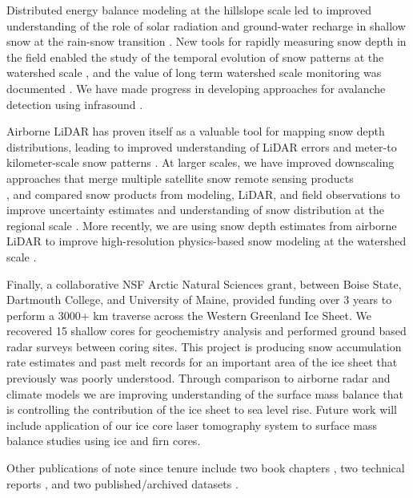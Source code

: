 \documentclass[11pt]{article}
\begin{document}
Distributed energy balance modeling at the hillslope scale led to improved understanding of the role of solar radiation and ground-water recharge in shallow snow at the rain-snow transition \citep{Kormos:2014b,Kormos:2014,Kormos:2015}.  New tools for rapidly measuring snow depth in the field enabled the study of the temporal evolution of snow patterns at the watershed scale \citep{Anderson:2014}, and the value of long term watershed scale monitoring was documented \citep{McNamara:2017}.  We have made progress in developing approaches for avalanche detection using infrasound \citep{Havens:2014}.

Airborne LiDAR has proven itself as a valuable tool for mapping snow depth distributions, leading to improved understanding of LiDAR errors and meter-to kilometer-scale snow patterns \citep{Tinkham:2013,McCreight:2014,Tinkham:2014}.
At larger scales, we have improved downscaling approaches that merge multiple satellite snow remote sensing products \\
\citep{Walters:2014}, and compared snow products from modeling, LiDAR, and field observations to improve uncertainty estimates 
and understanding of snow distribution at the regional scale \citep{Hedrick:2015}.  More recently, we are using snow depth estimates from airborne LiDAR to improve high-resolution physics-based snow modeling at the watershed scale \citep{Hedrick:2018}.

Finally, a collaborative NSF Arctic Natural Sciences grant, between Boise State, Dartmouth College, and University of Maine, provided funding over 3 years to perform a 3000+ km traverse across the Western Greenland Ice Sheet.  We recovered 15 shallow cores for geochemistry analysis \citep{Graeter:2018} and performed ground based radar surveys between coring sites.  This project is producing snow accumulation rate estimates and past melt records for an important area of the ice sheet that previously was poorly understood. Through comparison to airborne radar and climate models \citep{Lewis:2017} we are improving understanding of the surface mass balance that is controlling the contribution of the ice sheet to sea level rise.  Future work will include application of our ice core laser tomography system \citep{Mikesell:2017} to surface mass balance studies using ice and firn cores.

Other publications of note since tenure include two book chapters \citep{Marshall:2015,Arenson:2015}, two technical reports \citep{Havens:2014b,Rott:2013}, and two published/archived datasets \citep{Elder:2018,Brucker:2018}.  
\end{document}
